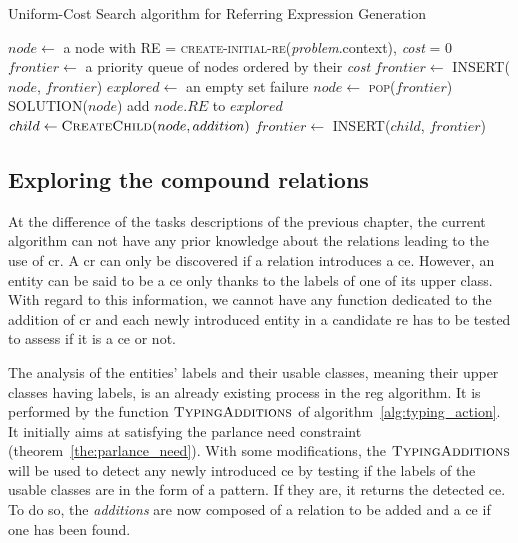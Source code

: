 \begin{algorithm}[!ht]
\caption{Uniform-Cost Search algorithm for Referring Expression Generation}
\label{alg:chap7_ucs}
\begin{algorithmic}
    \State $node\leftarrow$ a node with RE = \textsc{create-initial-re}(\textit{problem}.context), \textit{cost} = 0
    \State $frontier\leftarrow$ a priority queue of nodes ordered by their \textit{cost}
    \State $frontier\leftarrow$ \textsc{INSERT}($node$, $frontier$)
    \State $explored\leftarrow$ an empty set
    \Loop
        	\State \Return failure
        \EndIf
        \State $node\leftarrow$ \textsc{pop}($frontier$)
        	\State \Return \textsc{SOLUTION}($node$)
        \EndIf
        \State add $node.RE$ to $explored$
            \State $child \leftarrow \textsc{CreateChild}(node, addition)$
            	\State $frontier\leftarrow$ \textsc{INSERT}($child$, $frontier$)
            \EndIf
        \EndFor
    \EndLoop
\EndFunction
\end{algorithmic}
\end{algorithm}

\subsection{Exploring the compound relations}

At the difference of the tasks descriptions of the previous chapter, the current algorithm can not have any prior knowledge about the relations leading to the use of \acrshort{cr}. A \acrshort{cr} can only be discovered if a relation introduces a \acrshort{ce}. However, an entity can be said to be a \acrshort{ce} only thanks to the labels of one of its upper class. With regard to this information, we cannot have any function dedicated to the addition of \acrshort{cr} and each newly introduced entity in a candidate \acrshort{re} has to be tested to assess if it is a \acrshort{ce} or not.

The analysis of the entities' labels and their usable classes, meaning their upper classes having labels, is an already existing process in the \acrshort{reg} algorithm. It is performed by the function $\textsc{TypingAdditions}$ of algorithm~\ref{alg:typing_action}. It initially aims at satisfying the parlance need constraint (theorem~\ref{the:parlance_need}). With some modifications, the $\textsc{TypingAdditions}$ will be used to detect any newly introduced \acrshort{ce} by testing if the labels of the usable classes are in the form of a pattern. If they are, it returns the detected \acrshort{ce}. To do so, the \textit{additions} are now composed of a relation to be added and a \acrshort{ce} if one has been found.

